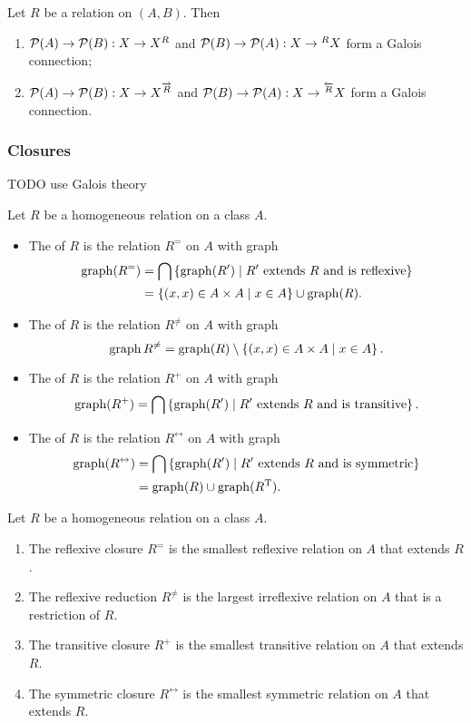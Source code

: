 \begin{proposition}
Let $R$ be a relation on $(A,B)$. Then
\begin{enumerate}
\item $\operatorname{\mathcal{P}}(A)\to \operatorname{\mathcal{P}}(B): X\to X^R$ and $\operatorname{\mathcal{P}}(B)\to \operatorname{\mathcal{P}}(A): X\to {^RX}$ form a Galois connection;
\item $\operatorname{\mathcal{P}}(A)\to \operatorname{\mathcal{P}}(B): X\to X^{\overrightarrow{R}}$ and $\operatorname{\mathcal{P}}(B)\to \operatorname{\mathcal{P}}(A): X\to {^{\overleftarrow{R}}X}$ form a Galois connection.
\end{enumerate}
\end{proposition}

\subsubsection{Closures}
TODO use Galois theory
\begin{definition}
Let $R$ be a homogeneous relation on a class $A$.
\begin{itemize}
\item The  of $R$ is the relation $R^=$ on $A$ with graph
\begin{align*}
\operatorname{graph}(R^=) &= \bigcap\left\{ \operatorname{graph}(R') \;\middle|\; \text{$R'$ extends $R$ and is reflexive} \right\} \\
&= \left\{ (x,x)\in A\times A \;\middle|\; x\in A \right\}\cup \operatorname{graph}(R).
\end{align*}
\item The  of $R$ is the relation $R^{\neq}$ on $A$ with graph
\[ \operatorname{graph}{R^{\neq}} = \operatorname{graph}(R)\setminus \left\{ (x,x)\in A\times A \;\middle|\; x \in A \right\}. \]
\item The  of $R$ is the relation $R^{+}$ on $A$ with graph
\[ \operatorname{graph}(R^+) = \bigcap\left\{ \operatorname{graph}(R') \;\middle|\; \text{$R'$ extends $R$ and is transitive} \right\}. \]
\item The  of $R$ is the relation $R^{\leftrightarrow}$ on $A$ with graph
\begin{align*}
\operatorname{graph}(R^\leftrightarrow) &= \bigcap\left\{ \operatorname{graph}(R') \;\middle|\; \text{$R'$ extends $R$ and is symmetric} \right\} \\
&=  \operatorname{graph}(R)\cup \operatorname{graph}(R^{\mathrm{T}}).
\end{align*}
\end{itemize}
\end{definition}

\begin{lemma}
Let $R$ be a homogeneous relation on a class $A$.
\begin{enumerate}
\item The reflexive closure $R^=$ is the smallest reflexive relation on $A$ that extends $R$.
\item The reflexive reduction $R^{\neq}$ is the largest irreflexive relation on $A$ that is a restriction of $R$.
\item The transitive closure $R^{+}$ is the smallest transitive relation on $A$ that extends $R$.
\item The symmetric closure $R^{\leftrightarrow}$ is the smallest symmetric relation on $A$ that extends $R$.
\end{enumerate}
\end{lemma}


